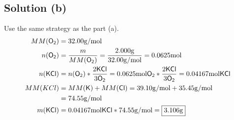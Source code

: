 \documentclass[10pt]{article}
\begin{document}
        \subsection{Solution (b)}
            Use the same strategy as the part (a).
            \begin{align}
                MM(\ce{O2}) &=  32.00 \unit{\gram/\mole}\\
                n(\ce{O2})  &=  \frac{m}{MM(\ce{O2})}
                    =   \frac{2.000 \unit{\gram}}{32.00 \unit{\gram/\mole}}
                    =   0.0625 \unit{\mole}\\
                n(\ce{KCl}) &=  n(\ce{O2}) * \frac{2 \ce{KCl}}{3 \ce{O2}}
                    =   0.0625 \unit{\mole} \ce{O2} * \frac{2 \ce{KCl}}{3\ce{O2}}
                    =   0.04167 \unit{\mole} \ce{KCl}\\
                MM(KCl) &=  MM(\ce{K}) + MM(\ce{Cl})
                    =   39.10 \unit{\gram/\mole} + 35.45 \unit{\gram/\mole}\\
                    &=  74.55 \unit{\gram/\mole}\\
                m(\ce{KCl}) &=  0.04167 \unit{\mole} \ce{KCl} * 74.55 \unit{\gram/\mole}
                    =   \boxed{3.106 \unit{\gram}}
            \end{align}
\end{document}
